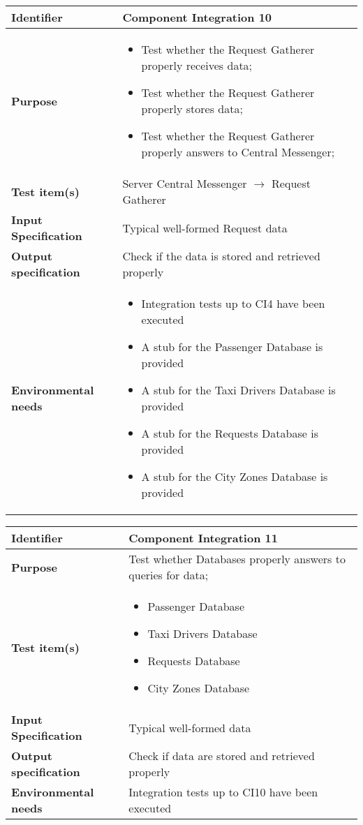 \begin{center}
\begin{tabular}{lp{}}
\toprule
\textbf{Identifier}		&	Component Integration 10\\
\midrule
\textbf{Purpose}		&	\begin{itemize}
					\item Test whether the Request Gatherer properly receives data;
					\item Test whether the Request Gatherer properly stores data; 
					\item Test whether the Request Gatherer properly answers to Central Messenger;
					\end{itemize}	\\
\textbf{Test item(s)}	&	Server Central Messenger $\rightarrow$ Request Gatherer\\
\textbf{Input Specification}	&	Typical well-formed Request data\\
\textbf{Output specification}	&	Check if the data is stored and retrieved properly\\
\textbf{Environmental needs}	&	\begin{itemize}
							\item Integration tests up to CI4 have been executed
							\item A stub for the Passenger Database is provided
							\item A stub for the Taxi Drivers Database is provided
							\item A stub for the Requests Database is provided
							\item A stub for the City Zones Database is provided
							\end{itemize}	\\
\bottomrule
\end{tabular}
\end{center}



\begin{center}
\begin{tabular}{lp{}}
\toprule
\textbf{Identifier}		&	Component Integration 11\\
\midrule
\textbf{Purpose}		& Test whether Databases properly answers to queries for data;\\
\textbf{Test item(s)}	&	\begin{itemize}
					\item Passenger Database
					\item Taxi Drivers Database
					\item Requests Database
					\item City Zones Database
					\end{itemize}	\\
\textbf{Input Specification}	&	Typical well-formed data\\
\textbf{Output specification}	&	Check if data are stored and retrieved properly\\
\textbf{Environmental needs}	& Integration tests up to CI10 have been executed\\
\bottomrule
\end{tabular}
\end{center}

